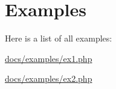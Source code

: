 \section{\-Examples}
\-Here is a list of all examples\-:\begin{DoxyCompactItemize}
\item 
\hyperlink{docs_2examples_2ex1_8php-example}{docs/examples/ex1.\-php}
\item 
\hyperlink{docs_2examples_2ex2_8php-example}{docs/examples/ex2.\-php}
\end{DoxyCompactItemize}
